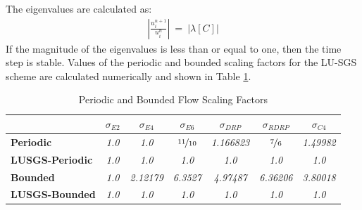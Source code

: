 \documentclass[conf]{new-aiaa}
\begin{document}
The eigenvalues are calculated as:
\begin{equation}
	\begin{split}
		\label{eq:Magnitude_Of_Eigen}
  			\left|\frac{u_i^{n+1}}{u_i^{n}}\right|~=~\left|\lambda\left[C\right]\right|
	\end{split}
\end{equation}
If the magnitude of the eigenvalues is less than or equal to one, then the time step is stable.   
Values of the periodic and bounded scaling factors for the LU-SGS scheme are calculated numerically and shown in Table \ref{tab:Scaling}.

\begin{table}[htp!]
\centering
\caption{Periodic and Bounded Flow Scaling Factors}
\begin{tabular}{|l|c|c|c|c|c|c|}
\hline
 & \multicolumn{1}{c|}{\textbf{$\sigma_{E2}$}} & \multicolumn{1}{c|}{\textbf{$\sigma_{E4}$}} & \multicolumn{1}{c|}{$\sigma_{E6}$} & \multicolumn{1}{c|}{$\sigma_{DRP}$} & \multicolumn{1}{c|}{$\sigma_{RDRP}$}& \multicolumn{1}{c|}{$\sigma_{C4}$}\\ \hline
\textbf{Periodic} & \textit{1.0} & \textit{1.0} & \textit{$\nicefrac{11}{10}$} & \textit{1.166823} & \textit{$\nicefrac{7}{6}$} & \textit{1.49982}\\ \hline
\textbf{LUSGS-Periodic} & \textit{1.0} & \textit{1.0} & \textit{1.0} & \textit{1.0} & \textit{1.0} & \textit{1.0}\\ \hline
\textbf{Bounded} & \textit{1.0} & \textit{2.12179} & \textit{6.3527} & 
	\textit{4.97487} & 
	\textit{6.36206}& 
	\textit{3.80018}\\ \hline
\textbf{LUSGS-Bounded} & \textit{1.0} & \textit{1.0} & \textit{1.0} & \textit{1.0} & \textit{1.0} & \textit{1.0}\\ \hline
\end{tabular}
\label{tab:Scaling}
\end{table}
\end{document}
